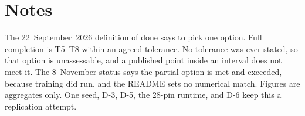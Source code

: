 \documentclass[11pt,letterpaper]{article}
\begin{document}
\section*{Notes}
The 22~September~2026 definition of done says to pick one option. Full completion is T5--T8 within an agreed tolerance. No tolerance was ever stated, so that option is unassessable, and a published point inside an interval does not meet it. The 8~November status says the partial option is met and exceeded, because training did run, and the README sets no numerical match. Figures are aggregates only. One seed, D-3, D-5, the 28-pin runtime, and D-6 keep this a replication attempt.
\end{document}
